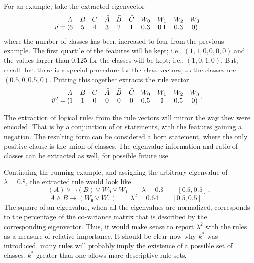 \documentclass[10pt]{article}
\begin{document}
For an example, take the extracted eigenvector
\[\mqty{\, \\\vec{v} = } \:\mqty{A&B&C&\bar{A}&\bar{B}&\bar{C}&W_0&W_1&W_2&W_3\\(6&5&4&3&2&1&0.3&0.1&0.3&0)}\]
where the number of classes has been increased to four from the previous example. The first quartile of the features will be kept; i.e., $(1,1,0,0,0,0)$ and the values larger than $0.125$ for the classes will be kept; i.e., $(1, 0, 1, 0)$. But, recall that there is a special procedure for the class vectors, so the classes are $(0.5, 0, 0.5, 0)$. Putting this together extracts the rule vector 
\[\mqty{\, \\\vec{v}\, ^\prime = } \:\mqty{A&B&C&\bar{A}&\bar{B}&\bar{C}&W_0&W_1&W_2&W_3\\(1&1&0&0&0&0&0.5&0&0.5&0)} \, .\]

The extraction of logical rules from the rule vectors will mirror the way they were encoded. That is by a conjunction of or statements, with the features gaining a negation. The resulting form can be considered a horn statement, where the only positive clause is the union of classes. The eigenvalue information and ratio of classes can be extracted as well, for possible future use. 

Continuing the running example, and assigning the arbitrary eigenvalue of $\lambda =0.8$, the extracted rule would look like
\[\neg(A)\lor \neg(B) \lor W_0 \lor W_1 \qquad \lambda=0.8 \qquad [0.5, 0.5] \, ,\]
\[A \land B \rightarrow (W_0 \lor W_1) \qquad \lambda^2=0.64 \qquad [0.5, 0.5] \, .\]
The square of an eigenvalue, when all the eigenvalues are normalized, corresponds to the percentage of the co-variance matrix that is described by the corresponding eigenvector. Thus, it would make sense to report $\lambda^2$ with the rules as a measure of relative importance. It should be clear now why $k^*$ was introduced. many rules will probably imply the existence of a possible set of classes. $k^*$ greater than one allows more descriptive rule sets.
\end{document}
